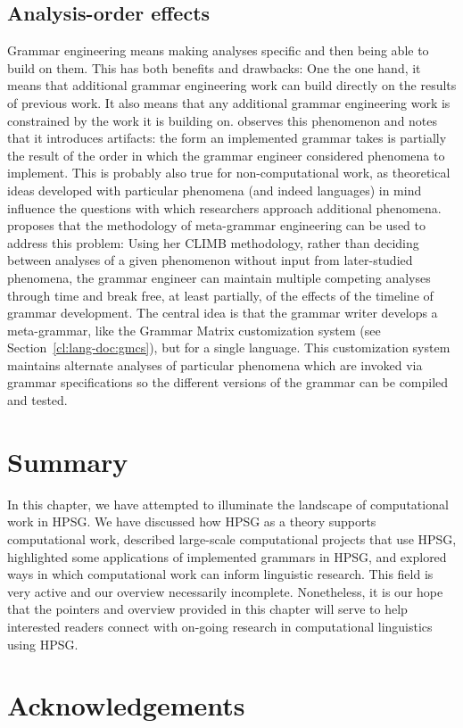 \documentclass[output=paper,nonflat]{langsci/langscibook}
\begin{document}
\subsection{Analysis-order effects}
Grammar engineering means making analyses
specific and then being able to build on them. This has both benefits
and drawbacks: One the one hand, it means that additional grammar
engineering work can build directly on the results of previous
work. It also means that any additional grammar engineering work is
constrained by the work it is building on.  \cite{Fokkens:14} observes
this phenomenon and notes that it introduces artifacts: the form an
implemented grammar takes is partially the result of the order in
which the grammar engineer considered phenomena to implement. This is
probably also true for non-computational work, as theoretical ideas
developed with particular phenomena (and indeed languages) in mind
influence the questions with which researchers approach additional
phenomena. \citeauthor{Fokkens:14} proposes that the methodology of
meta-grammar engineering can be used to address this problem: Using
her CLIMB methodology, rather than deciding between analyses of a
given phenomenon without input from later-studied phenomena, the
grammar engineer can maintain multiple competing analyses through time
and break free, at least partially, of the effects of the timeline of
grammar development. The central idea is that the grammar writer develops
a meta-grammar, like the Grammar Matrix customization system (see Section~\ref{cl:lang-doc:gmcs}),
but for a single language. This customization system maintains
alternate analyses of particular phenomena which are invoked via grammar
specifications so the different versions of the grammar can be compiled
and tested.


\section{Summary}

In this chapter, we have attempted to illuminate the landscape of
computational work in HPSG. We have discussed how HPSG as a theory
supports computational work, described large-scale computational
projects that use HPSG, highlighted some applications of implemented
grammars in HPSG, and explored ways in which computational work can
inform linguistic research. This field is very active and our overview
necessarily incomplete. Nonetheless, it is our hope that the pointers
and overview provided in this chapter will serve to help interested readers
connect with on-going research in computational linguistics using HPSG.



\section*{Acknowledgements}


{\sloppy
\printbibliography[heading=subbibliography,notkeyword=this] 
}
\end{document}
